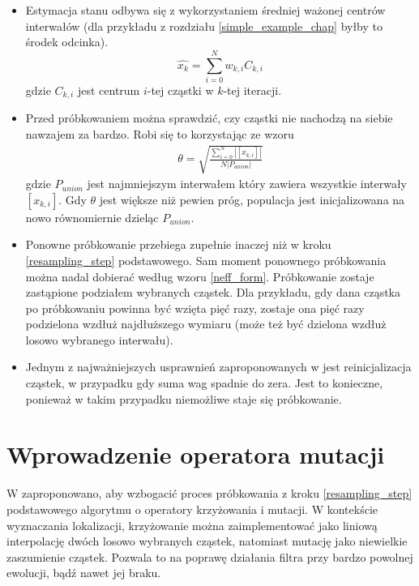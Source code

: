 \begin{itemize}
	\item Estymacja stanu odbywa się z wykorzystaniem średniej ważonej centrów interwałów (dla przykładu z rozdziału \ref{simple_example_chap} byłby to środek odcinka).
	\begin{equation}
		\hat{x_k} = \sum_{i=0}^{N} w_{k,i} C_{k,i}
	\end{equation}
	gdzie $C_{k,i}$ jest centrum $i$-tej cząstki w $k$-tej iteracji.
	\item Przed próbkowaniem można sprawdzić, czy cząstki nie nachodzą na siebie nawzajem za bardzo. Robi się to korzystając ze wzoru
	\begin{equation}
		\begin{aligned}
			\theta = \sqrt{\frac{\sum_{i=0}^{N}|[x_{k,i}]|}{N |P_{union}|}}
		\end{aligned}
	\end{equation}
	gdzie $P_{union}$ jest najmniejszym interwałem który zawiera wszystkie interwały $[x_{k,i}]$. Gdy $\theta$ jest większe niż pewien próg, populacja jest inicjalizowana na nowo równomiernie dzieląc $P_{union}$.
	
	\item Ponowne próbkowanie przebiega zupełnie inaczej niż w kroku \ref{resampling_step} podstawowego. Sam moment ponownego próbkowania można nadal dobierać według wzoru \ref{neff_form}. Próbkowanie zostaje zastąpione podziałem wybranych cząstek. Dla przykładu, gdy dana cząstka po próbkowaniu powinna być wzięta pięć razy, zostaje ona pięć razy podzielona wzdłuż najdłuższego wymiaru (może też być dzielona wzdłuż losowo wybranego interwału).
	\item Jednym z najważniejszych usprawnień zaproponowanych w \cite{brbpf} jest reinicjalizacja cząstek, w przypadku gdy suma wag spadnie do zera. Jest to konieczne, ponieważ w takim przypadku niemożliwe staje się próbkowanie.
\end{itemize}

\section{Wprowadzenie operatora mutacji} \label{evol_chap}
W \cite{pfgen} zaproponowano, aby wzbogacić proces próbkowania z kroku \ref{resampling_step} podstawowego algorytmu o operatory krzyżowania i mutacji. W kontekście wyznaczania lokalizacji, krzyżowanie można zaimplementować jako liniową interpolację dwóch losowo wybranych cząstek, natomiast mutację jako niewielkie zaszumienie cząstek. Pozwala to na poprawę działania filtra przy bardzo powolnej ewolucji, bądź nawet jej braku.

